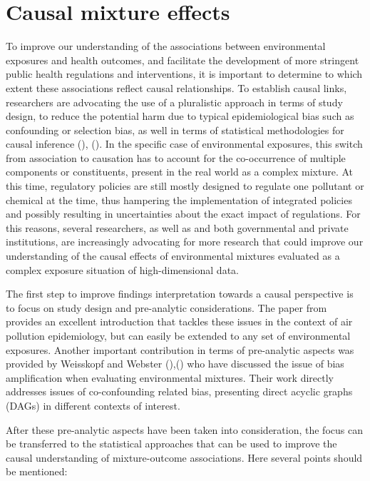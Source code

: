 \documentclass[
]{book}
\begin{document}
\hypertarget{causal-mixture-effects}{%
\section{Causal mixture effects}\label{causal-mixture-effects}}

To improve our understanding of the associations between environmental exposures and health outcomes, and facilitate the development of more stringent public health regulations and interventions, it is important to determine to which extent these associations reflect causal relationships. To establish causal links, researchers are advocating the use of a pluralistic approach in terms of study design, to reduce the potential harm due to typical epidemiological bias such as confounding or selection bias, as well in terms of statistical methodologies for causal inference (\citet{vandenbroucke2016causality}), (\citet{dominici2017best}). In the specific case of environmental exposures, this switch from association to causation has to account for the co-occurrence of multiple components or constituents, present in the real world as a complex mixture. At this time, regulatory policies are still mostly designed to regulate one pollutant or chemical at the time, thus hampering the implementation of integrated policies and possibly resulting in uncertainties about the exact impact of regulations. For this reasons, several researchers, as well as and both governmental and private institutions, are increasingly advocating for more research that could improve our understanding of the causal effects of environmental mixtures evaluated as a complex exposure situation of high-dimensional data.

The first step to improve findings interpretation towards a causal perspective is to focus on study design and pre-analytic considerations. The paper from \citet{dominici2017best} provides an excellent introduction that tackles these issues in the context of air pollution epidemiology, but can easily be extended to any set of environmental exposures. Another important contribution in terms of pre-analytic aspects was provided by Weisskopf and Webster (\citet{weisskopf2018bias}),(\citet{webster2020epidemiology}) who have discussed the issue of bias amplification when evaluating environmental mixtures. Their work directly addresses issues of co-confounding related bias, presenting direct acyclic graphs (DAGs) in different contexts of interest.

After these pre-analytic aspects have been taken into consideration, the focus can be transferred to the statistical approaches that can be used to improve the causal understanding of mixture-outcome associations. Here several points should be mentioned:
\end{document}
